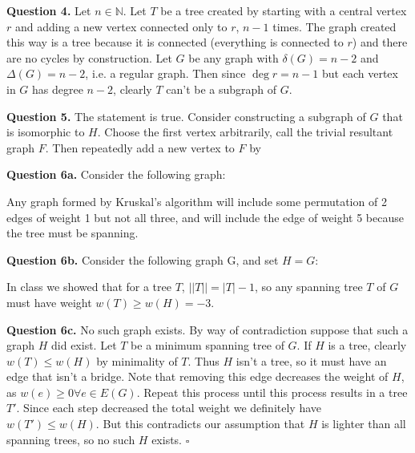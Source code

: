 \documentclass[letterpaper, reqno,11pt]{article}
\begin{document}
{\medskip\noindent\bf Question 4.} Let $n\in \mathbb{N}$. Let $T$ be a tree created by starting with a central vertex $r$ and adding a new vertex connected only to $r$, $n-1$ times. The graph created this way is a tree because it is connected (everything is connected to $r$) and there are no cycles by construction. Let $G$ be any graph with $\delta(G)=n-2$ and $\Delta(G)=n-2$, i.e. a regular graph. Then since $\deg r=n-1$ but each vertex in $G$ has degree $n-2$, clearly $T$ can't be a subgraph of $G$. 

{\medskip\noindent\bf Question 5.} The statement is true. Consider constructing a subgraph of $G$ that is isomorphic to $H$. Choose the first vertex arbitrarily, call the trivial resultant graph $F$. Then repeatedly add a new vertex to $F$ by 

{\medskip\noindent\bf Question 6a.} Consider the following graph:

\begin{center}
\end{center}

Any graph formed by Kruskal's algorithm will include some permutation of 2 edges of weight 1 but not all three, and will include the edge of weight 5 because the tree must be spanning. 

{\medskip\noindent\bf Question 6b.} Consider the following graph G, and set $H=G$: 

\begin{center}
\end{center}

In class we showed that for a tree $T$, $| |T| |=|T|-1$, so any spanning tree $T$ of $G$ must have weight $w(T)\geq w(H)=-3$. 

{\medskip\noindent\bf Question 6c.} No such graph exists. By way of contradiction suppose that such a graph $H$ did exist. Let $T$ be a minimum spanning tree of $G$. If $H$ is a tree, clearly $w(T)\leq w(H)$ by minimality of $T$. Thus $H$ isn't a tree, so it must have an edge that isn't a bridge. Note that removing this edge decreases the weight of $H$, as $w(e)\geq 0\forall e\in E(G)$. Repeat this process until this process results in a tree $T'$. Since each step decreased the total weight we definitely have $w(T')\leq w(H)$. But this contradicts our assumption that $H$ is lighter than all spanning trees, so no such $H$ exists. $\square$
\end{document}

